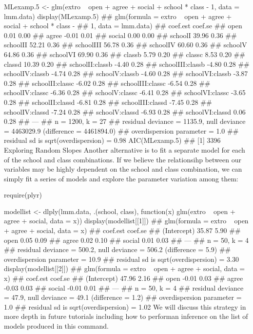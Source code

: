 MLexamp.5 <- glm(extro ~ open + agree + social + school * class - 1, data = lmm.data)
display(MLexamp.5)
## glm(formula = extro ~ open + agree + social + school * class - 
##     1, data = lmm.data)
##                  coef.est coef.se
## open              0.01     0.00  
## agree            -0.01     0.01  
## social            0.00     0.00  
## schoolI          39.96     0.36  
## schoolII         52.21     0.36  
## schoolIII        56.78     0.36  
## schoolIV         60.60     0.36  
## schoolV          64.86     0.36  
## schoolVI         69.90     0.36  
## classb            5.79     0.20  
## classc            8.53     0.20  
## classd           10.39     0.20  
## schoolII:classb  -4.40     0.28  
## schoolIII:classb -4.80     0.28  
## schoolIV:classb  -4.74     0.28  
## schoolV:classb   -4.60     0.28  
## schoolVI:classb  -3.87     0.28  
## schoolII:classc  -6.02     0.28  
## schoolIII:classc -6.54     0.28  
## schoolIV:classc  -6.36     0.28  
## schoolV:classc   -6.41     0.28  
## schoolVI:classc  -3.65     0.28  
## schoolII:classd  -6.81     0.28  
## schoolIII:classd -7.45     0.28  
## schoolIV:classd  -7.24     0.28  
## schoolV:classd   -6.93     0.28  
## schoolVI:classd   0.06     0.28  
## ---
##   n = 1200, k = 27
##   residual deviance = 1135.9, null deviance = 4463029.9 (difference = 4461894.0)
##   overdispersion parameter = 1.0
##   residual sd is sqrt(overdispersion) = 0.98
AIC(MLexamp.5)
## [1] 3396
Exploring Random Slopes
Another alternative is to fit a separate model for each of the school and class combinations. If we believe the relationsihp between our variables may be highly dependent on the school and class combination, we can simply fit a series of models and explore the parameter variation among them:

require(plyr)

modellist <- dlply(lmm.data, .(school, class), function(x) glm(extro ~ open + 
    agree + social, data = x))
display(modellist[[1]])
## glm(formula = extro ~ open + agree + social, data = x)
##             coef.est coef.se
## (Intercept) 35.87     5.90  
## open         0.05     0.09  
## agree        0.02     0.10  
## social       0.01     0.03  
## ---
##   n = 50, k = 4
##   residual deviance = 500.2, null deviance = 506.2 (difference = 5.9)
##   overdispersion parameter = 10.9
##   residual sd is sqrt(overdispersion) = 3.30
display(modellist[[2]])
## glm(formula = extro ~ open + agree + social, data = x)
##             coef.est coef.se
## (Intercept) 47.96     2.16  
## open        -0.01     0.03  
## agree       -0.03     0.03  
## social      -0.01     0.01  
## ---
##   n = 50, k = 4
##   residual deviance = 47.9, null deviance = 49.1 (difference = 1.2)
##   overdispersion parameter = 1.0
##   residual sd is sqrt(overdispersion) = 1.02
We will discuss this strategy in more depth in future tutorials including how to performan inference on the list of models produced in this command.

